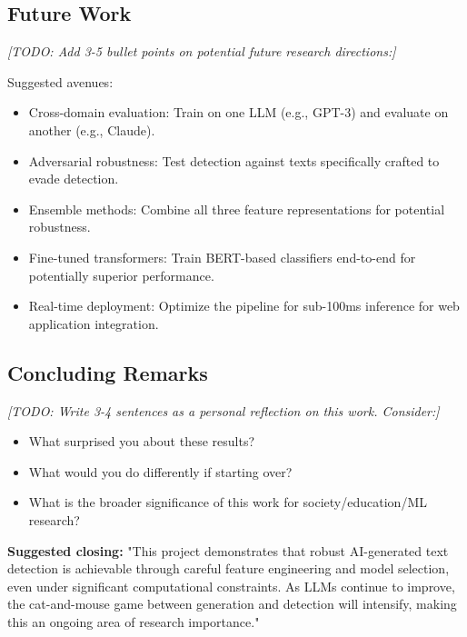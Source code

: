 \documentclass[12pt, a4paper]{article}
\begin{document}
\subsection{Future Work}

\textit{[TODO: Add 3-5 bullet points on potential future research directions:]}

Suggested avenues:
\begin{itemize}
    \item Cross-domain evaluation: Train on one LLM (e.g., GPT-3) and evaluate on another (e.g., Claude).
    \item Adversarial robustness: Test detection against texts specifically crafted to evade detection.
    \item Ensemble methods: Combine all three feature representations for potential robustness.
    \item Fine-tuned transformers: Train BERT-based classifiers end-to-end for potentially superior performance.
    \item Real-time deployment: Optimize the pipeline for sub-100ms inference for web application integration.
\end{itemize}

\subsection{Concluding Remarks}

\textit{[TODO: Write 3-4 sentences as a personal reflection on this work. Consider:]}
\begin{itemize}
    \item What surprised you about these results?
    \item What would you do differently if starting over?
    \item What is the broader significance of this work for society/education/ML research?
\end{itemize}

\textbf{Suggested closing:} "This project demonstrates that robust AI-generated text detection is achievable through careful feature engineering and model selection, even under significant computational constraints. As LLMs continue to improve, the cat-and-mouse game between generation and detection will intensify, making this an ongoing area of research importance."
\end{document}
